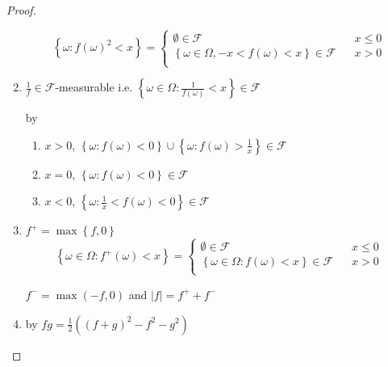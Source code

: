 \begin{proof}
\begin{enumerate}
		\begin{equation}
		\left\{ {\omega :f{{\left( \omega  \right)}^2} < x} \right\} = \left\{ {\begin{matrix}
			{\emptyset  \in \mathcal{F}}  \\ 
			{\left\{ {\omega  \in \Omega , - x < f\left( \omega  \right) < x} \right\} \in \mathcal{F}}  \\ 
			
			\end{matrix} } \right.\;\;\;\begin{matrix}
		{x \leqslant 0}  \\ 
		{x > 0}  \\ 
		
		\end{matrix} 
		\label{eq11.2}
		\end{equation}
		\item $\frac{1}{f} \in \mathcal{F}$-measurable i.e. $\left\{ {\omega  \in \Omega :\frac{1}{{f\left( \omega  \right)}} < x} \right\} \in \mathcal{F}$
		
		by 
		\begin{enumerate}
			\item $ x > 0 $, $\left\{ {\omega :f\left( \omega  \right) < 0} \right\} \cup \left\{ {\omega :f\left( \omega  \right) > \frac{1}{x}} \right\} \in \mathcal{F}$
			\item $ x = 0 $, $\left\{ {\omega :f\left( \omega  \right) < 0} \right\} \in \mathcal{F}$
			\item $ x < 0 $, $\left\{ {\omega :\frac{1}{x} < f\left( \omega  \right) < 0} \right\} \in \mathcal{F}$
		\end{enumerate}
		\item ${f^ + } = \max \left\{ {f,0} \right\}$
		\begin{equation}
		\left\{ {\omega  \in \Omega :{f^ + }\left( \omega  \right) < x} \right\} = \left\{ {\begin{matrix}
			{\emptyset  \in \mathcal{F}}  \\ 
			{\left\{ {\omega  \in \Omega :f\left( \omega  \right) < x} \right\} \in \mathcal{F}}  \\ 
			
			\end{matrix} } \right.\;\;\;\begin{matrix}
		{x \leqslant 0}  \\ 
		{x > 0}  \\ 
		
		\end{matrix} 
		\label{eq11.3}
		\end{equation}
		
		${f^ - } = \max \left( { - f,0} \right)$ and $\left| f \right| = {f^ + } + {f^ - }$
		\item by $fg = \frac{1}{2}\left( {{{\left( {f + g} \right)}^2} - {f^2} - {g^2}} \right)$
	\end{enumerate}
\end{proof}


